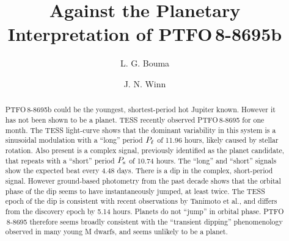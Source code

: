 \documentclass[12pt,twocolumn,tighten]{aastex62}
\begin{document}

\title{Against the Planetary Interpretation of PTFO$\,$8-8695b}


%
%
\author[0000-0002-0514-5538]{L. G. Bouma}
%
\author[0000-0002-4265-047X]{J. N. Winn}

%
%

\begin{abstract}
  PTFO$\,$8-8695b could be the youngest, shortest-period 
  hot Jupiter known.  However it has not been shown to be a planet.
  TESS recently observed PTFO$\,$8-8695 for one month.
  The TESS light-curve shows that the dominant variability in this
  system is a sinusoidal modulation with a ``long'' period $P_{\rm
  \ell}$
  of 11.96 hours, likely caused by stellar rotation.
  Also present is a complex signal, previously identified as the
  planet candidate, that repeats with a ``short'' period $P_{\rm s}$ of
  10.74 hours.
  The ``long'' and ``short'' signals show the expected beat every 4.48
  days.
  There is a dip in the complex, short-period signal.
  However ground-based photometry from the past decade shows that the
  orbital phase of the dip seems to have instantaneously jumped, at
  least twice.
  The TESS epoch of the dip is consistent with recent observations by
  Tanimoto et al., and differs from the discovery epoch by 5.14 hours.
  Planets do not ``jump'' in orbital phase.
  PTFO$\,$8-8695 therefore seems broadly consistent with the
  ``transient dipping'' phenomenology observed in many young M dwarfs,
  and seems unlikely to be a planet.
\end{abstract}
\end{document}
